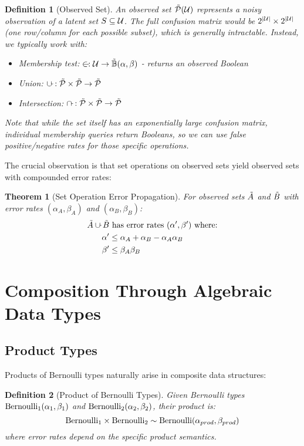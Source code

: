 \documentclass[11pt]{article}
\newtheorem{definition}{Definition}
\newtheorem{theorem}{Theorem}
\begin{document}
\begin{definition}[Observed Set]
An observed set $\tilde{\mathcal{P}}(\mathcal{U})$ represents a noisy observation of a latent set $S \subseteq \mathcal{U}$. The full confusion matrix would be $2^{|\mathcal{U}|} \times 2^{|\mathcal{U}|}$ (one row/column for each possible subset), which is generally intractable. Instead, we typically work with:
\begin{itemize}
\item Membership test: $\in_{\tilde{}}: \mathcal{U} \to \tilde{\mathbb{B}}(\alpha, \beta)$ - returns an observed Boolean
\item Union: $\cup_{\tilde{}}: \tilde{\mathcal{P}} \times \tilde{\mathcal{P}} \to \tilde{\mathcal{P}}$
\item Intersection: $\cap_{\tilde{}}: \tilde{\mathcal{P}} \times \tilde{\mathcal{P}} \to \tilde{\mathcal{P}}$
\end{itemize}
Note that while the set itself has an exponentially large confusion matrix, individual membership queries return Booleans, so we can use false positive/negative rates for those specific operations.
\end{definition}

The crucial observation is that set operations on observed sets yield observed sets with compounded error rates:

\begin{theorem}[Set Operation Error Propagation]
For observed sets $\tilde{A}$ and $\tilde{B}$ with error rates $(\alpha_A, \beta_A)$ and $(\alpha_B, \beta_B)$:
\begin{align}
\tilde{A} \cup_{\tilde{}} \tilde{B} &\text{ has error rates } (\alpha', \beta') \text{ where:} \\
\alpha' &\leq \alpha_A + \alpha_B - \alpha_A\alpha_B \\
\beta' &\leq \beta_A \beta_B
\end{align}
\end{theorem}

\section{Composition Through Algebraic Data Types}

\subsection{Product Types}

Products of Bernoulli types naturally arise in composite data structures:

\begin{definition}[Product of Bernoulli Types]
Given Bernoulli types $\text{Bernoulli}_1(\alpha_1, \beta_1)$ and $\text{Bernoulli}_2(\alpha_2, \beta_2)$, their product is:
$$\text{Bernoulli}_1 \times \text{Bernoulli}_2 \sim \text{Bernoulli}(\alpha_{prod}, \beta_{prod})$$
where error rates depend on the specific product semantics.
\end{definition}
\end{document}
